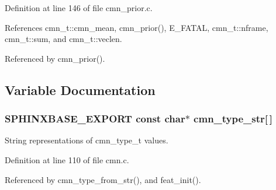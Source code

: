 \-Definition at line 146 of file cmn\-\_\-prior.\-c.



\-References cmn\-\_\-t\-::cmn\-\_\-mean, cmn\-\_\-prior(), \-E\-\_\-\-F\-A\-T\-A\-L, cmn\-\_\-t\-::nframe, cmn\-\_\-t\-::sum, and cmn\-\_\-t\-::veclen.



\-Referenced by cmn\-\_\-prior().



\subsection{\-Variable \-Documentation}
\subsubsection[{cmn\-\_\-type\-\_\-str}]{\setlength{\rightskip}{0pt plus 5cm}\-S\-P\-H\-I\-N\-X\-B\-A\-S\-E\-\_\-\-E\-X\-P\-O\-R\-T const char$\ast$ {\bf cmn\-\_\-type\-\_\-str}[$\,$]}\label{cmn_8h_ae2ab0bad7168386076c43fc2a421867f}


\-String representations of cmn\-\_\-type\-\_\-t values. 



\-Definition at line 110 of file cmn.\-c.



\-Referenced by cmn\-\_\-type\-\_\-from\-\_\-str(), and feat\-\_\-init().

